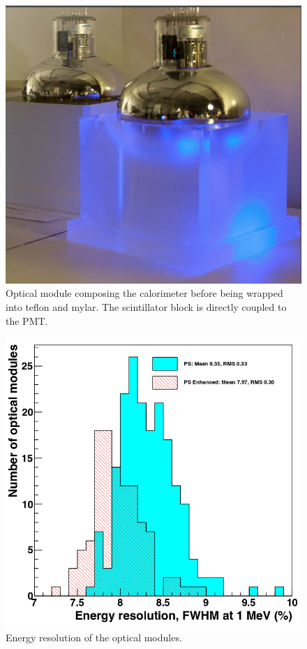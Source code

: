 \documentclass[main.tex]{subfiles}
\begin{document}
\begin{figure}[h!]
\begin{center}
\includegraphics[scale=0.25]{pictures/Chap3/calo_1.png}
\caption{Optical module composing the calorimeter before being wrapped into teflon and mylar. The scintillator block is directly coupled to the PMT.}
\label{SnemoOpticalModule}
\end{center}
\end{figure}


\begin{figure}[h!]
\begin{center}
\includegraphics[scale=0.25]{pictures/Chap3/EnergyResolution.png}
\caption{Energy resolution of the optical modules.}
\label{EnergyResolutionCaloBlock}
\end{center}
\end{figure}
\end{document}
